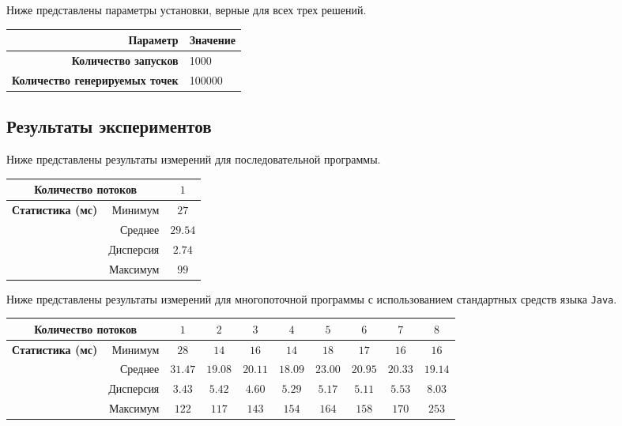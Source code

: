 Ниже представлены параметры установки, верные для всех трех решений. 
\begin{center}
    \begin{tabular}{r|l}
        \textbf{Параметр} & \textbf{Значение} \\ \hline
        \textbf{Количество запусков} & 1000 \\ 
        \textbf{Количество генерируемых точек} & 100000
    \end{tabular}
\end{center}

\subsection{Результаты экспериментов}

Ниже представлены результаты измерений для последовательной программы.
\begin{center}
    \begin{tabular}{c|r|c}
        \multicolumn{2}{c|}{\textbf{Количество потоков}} & $1$ \\ \hline \hline
        \multirow{4}{*}{\textbf{Статистика (мс)}} & Минимум & $27$ \\
        & Среднее & $29.54$ \\
        & Дисперсия & $2.74$ \\
        & Максимум & $99$
    \end{tabular}
\end{center}

Ниже представлены результаты измерений для многопоточной программы с использованием стандартных средств языка \texttt{Java}.
\begin{center}
    \begin{tabular}{c|r|c|c|c|c|c|c|c|c}
        \multicolumn{2}{c|}{\textbf{Количество потоков}} & $1$ & $2$ & $3$ & $4$ & $5$ & $6$ & $7$ & $8$ \\ \hline \hline
        \multirow{4}{*}{\textbf{Статистика (мс)}} & Минимум & $28$ & $14$ & $16$ & $14$ & $18$ & $17$ & $16$ & $16$ \\
        & Среднее & $31.47$ & $19.08$ & $20.11$ & $18.09$ & $23.00$ & $20.95$ & $20.33$ & $19.14$ \\
        & Дисперсия & $3.43$ & $5.42$ & $4.60$ & $5.29$ & $5.17$ & $5.11$ & $5.53$ & $8.03$ \\
        & Максимум & $122$ & $117$ & $143$ & $154$ & $164$ & $158$ & $170$ & $253$
    \end{tabular}
\end{center}

